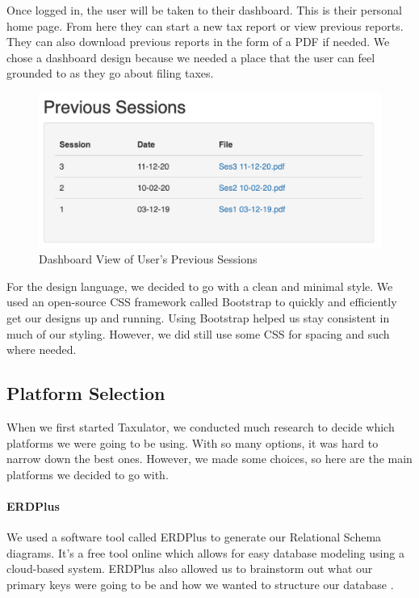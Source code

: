 \documentclass[sigconf]{acmart}
\begin{document}
Once logged in, the user will be taken to their dashboard. This is their personal home page. From here they can start a new tax report or view previous reports. They can also download previous reports in the form of a PDF if needed. We chose a dashboard design because we needed a place that the user can feel grounded to as they go about filing taxes.

\begin{figure}[H]
  \label{Dashboard}
  \centering
  \includegraphics[width=\linewidth]{Images/Dashboard.png}
  \caption{Dashboard View of User’s Previous Sessions}
\end{figure}

For the design language, we decided to go with a clean and minimal style. We used an open-source CSS framework called Bootstrap \cite{Bootstrap} to quickly and efficiently get our designs up and running. Using Bootstrap helped us stay consistent in much of our styling. However, we did still use some CSS for spacing and such where needed.

\subsection{Platform Selection}
When we first started Taxulator, we conducted much research to decide which platforms we were going to be using. With so many options, it was hard to narrow down the best ones. However, we made some choices, so here are the main platforms we decided to go with.

\paragraph{ERDPlus}
We used a software tool called ERDPlus to generate our Relational Schema diagrams. It’s a free tool online which allows for easy database modeling using a cloud-based system. ERDPlus also allowed us to brainstorm out what our primary keys were going to be and how we wanted to structure our database \cite{ERDPlus}.
\end{document}
